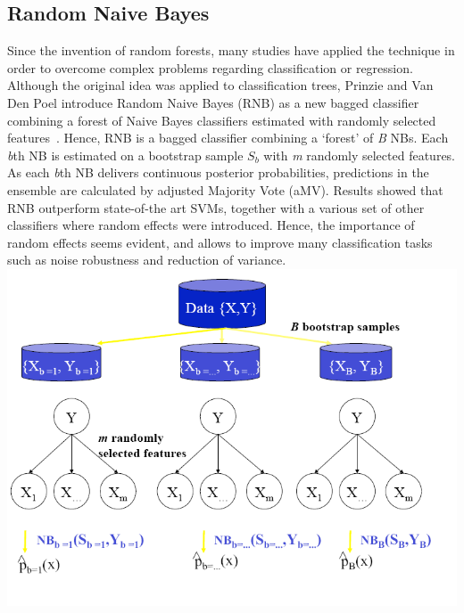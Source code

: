 \subsection{Random Naive Bayes}\label{rnb}
Since the invention of random forests, many studies have applied the technique in order to overcome complex problems regarding classification or regression. Although the original idea was applied to classification trees, Prinzie and Van Den Poel introduce Random Naive Bayes (RNB) as a new bagged classifier combining a forest of Naive Bayes classifiers estimated with randomly selected features~\cite{rmc07}. Hence, RNB is a bagged classifier
combining a ‘forest’ of \textit{B} NBs. Each \textit{b}th NB is estimated on a bootstrap sample \(S_b\) with \textit{m} randomly selected features.  As each \textit{b}th NB delivers continuous posterior probabilities, predictions in the ensemble are calculated by adjusted Majority Vote (aMV). Results showed that RNB outperform state-of-the art SVMs, together with a various set of other classifiers where random effects were introduced. Hence, the importance of random effects seems evident, and allows to improve many classification tasks such as noise robustness and reduction of variance.
\vspace{1cm}\\
\includegraphics[scale=0.45]{img/rnb.png}


\newpage
